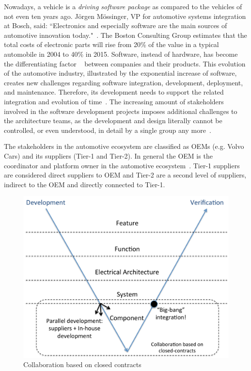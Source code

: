 Nowadays, a vehicle is a {\em driving software package} as compared to the vehicles of not even ten years ago. J\"orgen M\"ossinger, VP for automotive systems integration at Bosch, said: ``Electronics and especially software are the main sources of automotive innovation today."~\cite{Mossinger2010SoftwareAutomotive}. The Boston Consulting Group estimates that the total costs of electronic parts will rise from 20\% of the value in a typical automobile in 2004 to 40\% in 2015. Software, instead of hardware, has become the differentiating factor%
~\cite{ConnectedVehicle2012,hbr2015hardwaresoftware,Mossinger2010SoftwareAutomotive,Broy:2006:CAS:1134285.1134292} %
between companies and their products. This evolution of the automotive industry, illustrated by the exponential increase of software, creates new challenges regarding software integration, development, deployment, and maintenance. Therefore, its development needs to support the related integration and evolution of time~\cite{Broy:2006:CAS:1134285.1134292,Patrizio2016AAF_Chalmers,qualman2009socialnomics,JansenTale2009}. The increasing amount of stakeholders involved in the software development projects imposes additional challenges to the architecture teams, as the development and design literally cannot be controlled, or even understood, in detail by a single group any more~\cite{Patrizio2016AAF_Chalmers}. 

The stakeholders in the automotive ecosystem are classified as OEMs (e.g. Volvo Cars) and its suppliers (Tier-1 and Tier-2). In general the OEM is the coordinator and platform owner in the automotive ecosystem~\cite{KS15,Patrizio2016AAF_Chalmers}. Tier-1 suppliers are considered direct suppliers to OEM and Tier-2 are a second level of suppliers, indirect to the OEM and directly connected to Tier-1. %

\begin{figure}[htb]
\centering
\includegraphics[width=\columnwidth]{figure/Closed-contract-collaboration.pdf}
\caption{Collaboration based on closed contracts}
\label{fig:closedContractCollaboration}
\end{figure}

